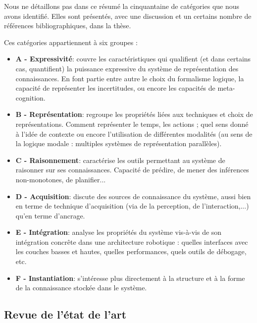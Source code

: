 Nous ne détaillons pas dans ce résumé la cinquantaine de catégories que nous
avons identifié. Elles sont présentés, avec une discussion et un certains
nombre de références bibliographiques, dans la thèse.

Ces catégories appartiennent à six groupes :

\begin{itemize}
    
    \item \textbf{A - Expressivité}: couvre les caractéristiques qui qualifient
        (et dans certains cas, quantifient) la puissance expressive du système
        de représentation des connaissances. En font partie entre autre le
        choix du formalisme logique, la capacité de représenter les
        incertitudes, ou encore les capacités de meta-cognition.

    \item \textbf{B - Représentation}: regroupe les propriétés liées aux
        techniques et choix de représentations. Comment représenter le temps,
        les actions ; quel sens donné à l'idée de contexte ou encore
        l'utilisation de différentes modalités (au sens de la logique modale :
        multiples systèmes de représentation parallèles).

    \item \textbf{C - Raisonnement}: caractérise les outils permettant au
        système de raisonner sur ses connaissances. Capacité de prédire, de
        mener des inférences non-monotones, de planifier...
    
    \item \textbf{D - Acquisition}: discute des sources de connaissance du
        système, aussi bien en terme de technique d'acquisition (via de la
        perception, de l'interaction,...) qu'en terme d'ancrage.
    
    \item \textbf{E - Intégration}: analyse les propriétés du système vis-à-vis
        de son intégration concrête dans une architecture robotique : quelles
        interfaces avec les couches basses et hautes, quelles performances,
        quels outils de débogage, etc.
    
    \item \textbf{F - Instantiation}: s'intéresse plus directement à la
        structure et à la forme de la connaissance stockée dans le système.

\end{itemize}

\subsection{Revue de l'état de l'art}
\label{sect|surveyed-systems}



